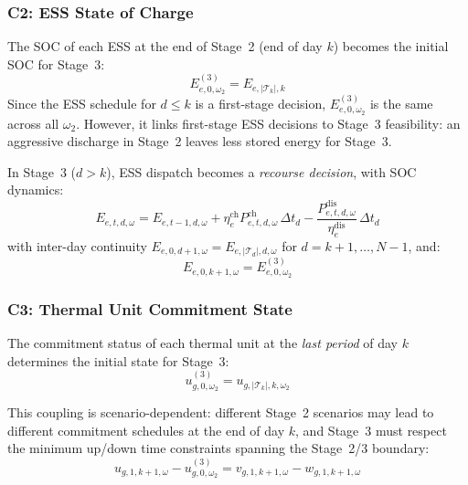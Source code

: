 \documentclass[11pt]{article}
\newcommand{\Pch}{P^{\mathrm{ch}}}
\newcommand{\Pdis}{P^{\mathrm{dis}}}
\begin{document}
\subsubsection{C2: ESS State of Charge}

The SOC of each ESS at the end of Stage~2 (end of day $k$) becomes the
initial SOC for Stage~3:
\begin{equation}\label{eq:couple-ess}
\boxed{
  E^{(3)}_{e,0,\omega_2}
  = E_{e,|\mathcal{T}_k|,k}
}
\end{equation}
Since the ESS schedule for $d \leq k$ is a first-stage decision,
$E^{(3)}_{e,0,\omega_2}$ is the same across all $\omega_2$. However, it
links first-stage ESS decisions to Stage~3 feasibility: an aggressive
discharge in Stage~2 leaves less stored energy for Stage~3.

In Stage~3 ($d > k$), ESS dispatch becomes a \emph{recourse decision},
with SOC dynamics:
\begin{equation}\label{eq:s3-ess-soc}
  E_{e,t,d,\omega} = E_{e,t-1,d,\omega}
  + \eta^{\mathrm{ch}}_e \Pch_{e,t,d,\omega}\,\Delta t_d
  - \frac{\Pdis_{e,t,d,\omega}}{\eta^{\mathrm{dis}}_e}\,\Delta t_d
\end{equation}
with inter-day continuity
$E_{e,0,d+1,\omega} = E_{e,|\mathcal{T}_d|,d,\omega}$ for
$d = k{+}1,\ldots,N{-}1$, and:
\begin{equation}\label{eq:s3-ess-init}
  E_{e,0,k+1,\omega} = E^{(3)}_{e,0,\omega_2}
\end{equation}

\subsubsection{C3: Thermal Unit Commitment State}

The commitment status of each thermal unit at the \emph{last period} of
day $k$ determines the initial state for Stage~3:
\begin{equation}\label{eq:couple-thermal}
\boxed{
  u^{(3)}_{g,0,\omega_2}
  = u_{g,|\mathcal{T}_k|,k,\omega_2}
}
\end{equation}

This coupling is scenario-dependent: different Stage~2 scenarios may
lead to different commitment schedules at the end of day $k$, and
Stage~3 must respect the minimum up/down time constraints spanning the
Stage~2/3 boundary:
\begin{equation}\label{eq:s3-transition-init}
  u_{g,1,k+1,\omega} - u^{(3)}_{g,0,\omega_2}
  = v_{g,1,k+1,\omega} - w_{g,1,k+1,\omega}
\end{equation}
\end{document}

